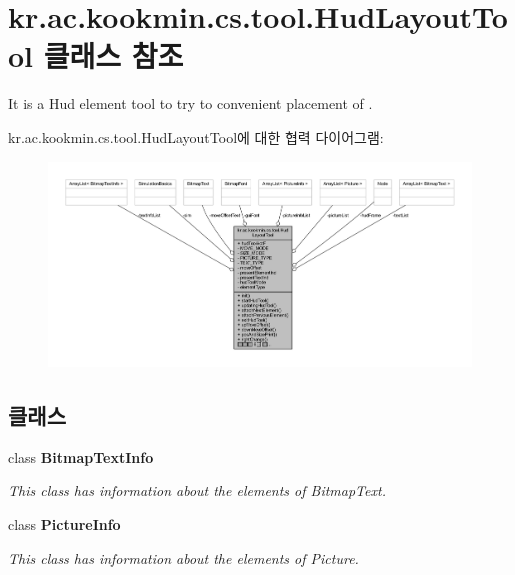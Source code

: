 \hypertarget{classkr_1_1ac_1_1kookmin_1_1cs_1_1tool_1_1_hud_layout_tool}{}\section{kr.\+ac.\+kookmin.\+cs.\+tool.\+Hud\+Layout\+Tool 클래스 참조}
\label{classkr_1_1ac_1_1kookmin_1_1cs_1_1tool_1_1_hud_layout_tool}


It is a Hud element tool to try to convenient placement of .  




kr.\+ac.\+kookmin.\+cs.\+tool.\+Hud\+Layout\+Tool에 대한 협력 다이어그램\+:\nopagebreak
\begin{figure}[H]
\begin{center}
\leavevmode
\includegraphics[width=350pt]{classkr_1_1ac_1_1kookmin_1_1cs_1_1tool_1_1_hud_layout_tool__coll__graph}
\end{center}
\end{figure}
\subsection*{클래스}
\begin{DoxyCompactItemize}
\item 
class {\bfseries Bitmap\+Text\+Info}
\begin{DoxyCompactList}\small\item\em This class has information about the elements of Bitmap\+Text. \end{DoxyCompactList}\item 
class {\bfseries Picture\+Info}
\begin{DoxyCompactList}\small\item\em This class has information about the elements of Picture. \end{DoxyCompactList}\end{DoxyCompactItemize}
